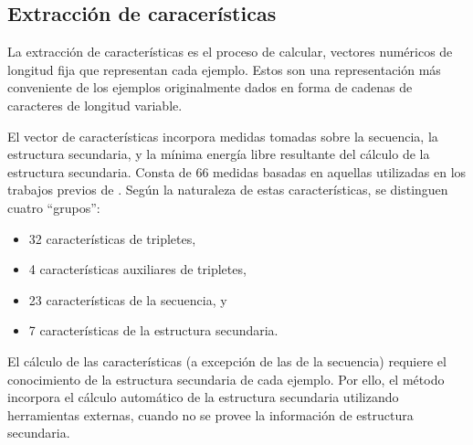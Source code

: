 %
%
%
\subsection{Extracción de caracerísticas}
%
La extracción de características es el proceso de calcular, vectores
numéricos de longitud fija que representan cada ejemplo.  Estos
 son una representación más conveniente
de los ejemplos originalmente dados en forma de cadenas de caracteres
de longitud variable.

El vector de características incorpora medidas tomadas sobre la
secuencia, la estructura secundaria, y la mínima energía libre
resultante del cálculo de la estructura secundaria. Consta de 66 medidas
basadas en aquellas utilizadas en los trabajos previos de \cite{xue, ng,
  batuwita}. Según la naturaleza de estas características, se
distinguen cuatro ``grupos'':
%
\begin{itemize}
\item 32 características de tripletes,
\item 4 características auxiliares de tripletes,
\item 23 características de la secuencia, y
\item 7 características de la estructura secundaria.
\end{itemize}
%
El cálculo de las características (a excepción de las de la secuencia)
requiere el conocimiento de la estructura secundaria de cada
ejemplo. Por ello, el método incorpora el cálculo automático de la
estructura secundaria utilizando herramientas externas, cuando no se
provee la información de estructura secundaria.
